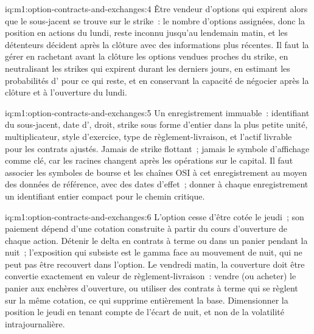 \begin{solution}{iq:m1:option-contracts-and-exchanges:4}
Être vendeur d'options qui expirent alors que le sous-jacent se trouve sur le strike~: le
nombre d'options assignées, donc la position en actions du lundi, reste inconnu jusqu'au
lendemain matin, et les détenteurs décident après la clôture avec des informations plus récentes. Il faut la gérer
en rachetant avant la clôture les options vendues proches du strike, en neutralisant les strikes qui
expirent durant les derniers jours, en estimant les probabilités d' pour ce qui reste, et en
conservant la capacité de négocier après la clôture
et à l'ouverture du lundi.
\end{solution}

\begin{solution}{iq:m1:option-contracts-and-exchanges:5}
Un enregistrement immuable~: identifiant du sous-jacent, date d', droit, strike
sous forme d'entier dans la plus petite unité, multiplicateur, style d'exercice,
type de règlement-livraison, et l'actif livrable pour les contrats ajustés. Jamais de strike flottant~;
jamais le symbole d'affichage comme clé, car les racines changent après les opérations sur le capital.
Il faut associer les symboles de bourse et les chaînes OSI à cet enregistrement au moyen des données de référence,
avec des dates d'effet~; donner à chaque enregistrement un identifiant entier compact pour le
chemin critique.
\end{solution}

\begin{solution}{iq:m1:option-contracts-and-exchanges:6}
L'option cesse d'être cotée le jeudi~; son paiement dépend d'une cotation construite
à partir du cours d'ouverture de chaque action. Détenir le delta en contrats à terme ou dans un panier
pendant la nuit~; l'exposition qui subsiste est le gamma face au mouvement de nuit,
qui ne peut pas être recouvert dans l'option. Le vendredi matin, la couverture doit
être convertie exactement en valeur de règlement-livraison~: vendre (ou acheter) le panier
aux enchères d'ouverture, ou utiliser des contrats à terme qui se règlent sur la même cotation, ce qui
supprime entièrement la base. Dimensionner la position le jeudi en tenant compte
de l'écart de nuit, et non de la volatilité intrajournalière.
\end{solution}
